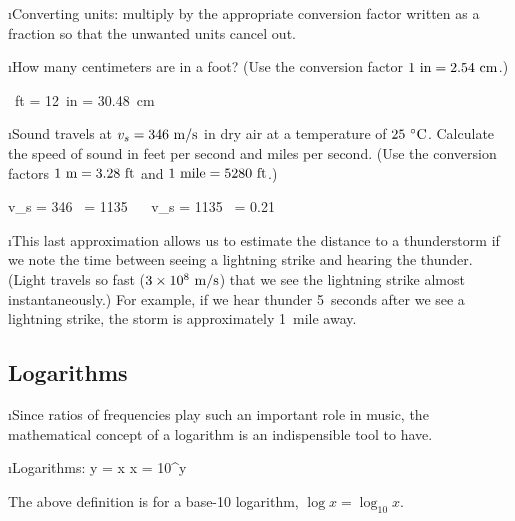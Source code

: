 \i Converting units:
multiply by the appropriate conversion factor written as
a fraction so that the unwanted units cancel out.
 
\i \exer How many centimeters are in a foot? 
(Use the conversion factor $1~{\rm in} = 2.54~{\rm cm}$.)

\ans
{}~{\rm ft} = 12~{\rm in}\cdot{} = 30.48~{\rm cm}
\ee

\i \exer Sound travels at $v_s=346~{\rm m/s}$ in dry air at a temperature
of $25~{}^\circ{\rm C}$.
Calculate the speed of sound in feet per second and miles per second.
(Use the conversion factors $1~{\rm m}=3.28~{\rm ft}$ and $1~{\rm mile} = 5280~{\rm ft}$.)

\ans
%
\be
v_s = 346~\cdot {}
= 1135~ 
~
\ee
%
\be
v_s = 1135~\cdot {}
= 0.21~
\approx {}~
\ee
%

\i This last approximation allows us to estimate the distance 
to a thunderstorm if
we note the time between seeing a lightning strike and hearing the thunder.
(Light travels so fast ($3\times 10^8~{\rm m/s}$) 
that we see the lightning strike almost instantaneously.)
For example, if we hear thunder 5~seconds after we see a lightning strike, the
storm is approximately 1~mile away.

\ei
\subsection{Logarithms}
\bi

\i Since ratios of frequencies play such an important role 
in music, the mathematical concept of a logarithm is an
indispensible tool to have.

\i Logarithms:
%
\be
y = \log x 
\quad\Leftrightarrow\quad
x = 10^y
\ee

The above definition is for a base-10 logarithm,
$\log x = \log_{10}x$.

